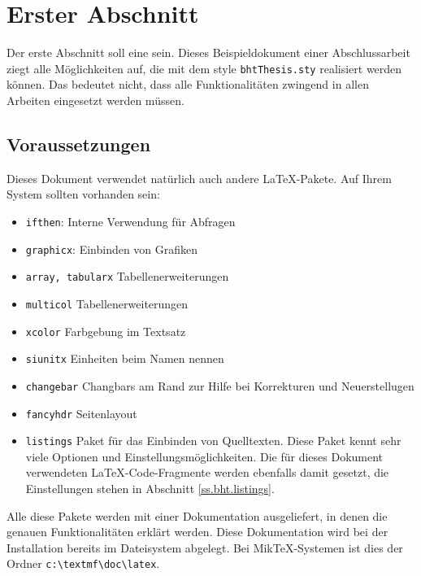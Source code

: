 
\chapter{Erster Abschnitt}

Der   erste   Abschnitt   soll   eine     sein.   Dieses
Beispieldokument einer  Abschlussarbeit ziegt alle  Möglichkeiten auf, die  mit dem
style  \texttt{bhtThesis.sty} realisiert  werden können.  Das bedeutet  nicht, dass
alle Funktionalitäten zwingend in allen Arbeiten eingesetzt werden müssen.

\section{Voraussetzungen}
Dieses  Dokument verwendet natürlich  auch andere  \LaTeX-Pakete. Auf  Ihrem System
sollten vorhanden sein:

\begin{itemize}
\item \texttt{ifthen}: Interne Verwendung für Abfragen
\item \texttt{graphicx}: 
  Einbinden von Grafiken
\item \texttt{array, tabularx}                  
  Tabellenerweiterungen
\item \texttt{multicol}                       
  Tabellenerweiterungen
\item \texttt{xcolor}                           
  Farbgebung im Textsatz
\item \texttt{siunitx}
  Einheiten beim Namen nennen
\item \texttt{changebar}
  Changbars am Rand zur Hilfe bei Korrekturen und Neuerstellugen
\item \texttt{fancyhdr} Seitenlayout
\item \texttt{listings} Paket für das  Einbinden von Quelltexten. Diese Paket kennt
  sehr  viele  Optionen  und  Einstellungsmöglichkeiten. Die  für  dieses  Dokument
  verwendeten   \LaTeX-Code-Fragmente   werden   ebenfalls   damit   gesetzt,   die
  Einstellungen stehen in Abschnitt \ref{ss.bht.listings}.
\end{itemize}

Alle diese Pakete werden mit einer Dokumentation ausgeliefert, in denen die genauen
Funktionalitäten  erklärt werden.   Diese Dokumentation  wird bei  der Installation
bereits  im  Dateisystem  abgelegt.   Bei  Mik\TeX-Systemen  ist  dies  der  Ordner
\verb|c:\textmf\doc\latex|.

